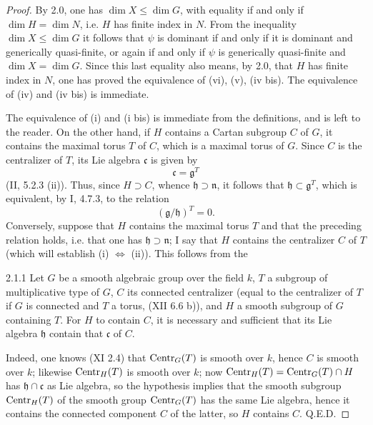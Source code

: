 \begin{proof}
By 2.0, one has $\dim X\leq\dim G$, with equality if and only if
$\dim H=\dim N$, i.e. $H$ has finite index in $N$. From the inequality
$\dim X\leq\dim G$ it follows that $\psi$ is dominant if and only if it
is dominant and generically quasi-finite, or again if and only if $\psi$
is generically quasi-finite and $\dim X=\dim G$. Since this last equality
also means, by 2.0, that $H$ has finite index in $N$, one has proved the
equivalence of (vi), (v), (iv bis). The equivalence of (iv) and (iv bis)
is immediate.

The equivalence of (i) and (i bis) is immediate from the definitions, and
is left to the reader. On the other hand, if $H$ contains a Cartan subgroup
$C$ of $G$, it contains the maximal torus $T$ of $C$, which is a maximal
torus of $G$. Since $C$ is the centralizer of $T$, its Lie algebra
$\mathfrak c$ is given by
\[
 \mathfrak c=\mathfrak g^T
\]
(II, 5.2.3 (ii)). Thus, since $H\supset C$, whence
$\mathfrak h\supset\mathfrak n$, it follows that
$\mathfrak h\subset\mathfrak g^T$, which is equivalent, by I, 4.7.3,
to the relation
\[
 (\mathfrak g/\mathfrak h)^T=0.\tag{x}
\]
Conversely, suppose that $H$ contains the maximal torus $T$ and that the
preceding relation holds, i.e. that one has $\mathfrak h\supset\mathfrak n$;
I say that $H$ contains the centralizer $C$ of $T$ (which will establish
(i) $\Leftrightarrow$ (ii)). This follows from the

\begin{lemma}{2.1.1}\label{XIII.2.1.1}
Let $G$ be a smooth algebraic group over the field $k$, $T$ a subgroup
of multiplicative type of $G$, $C$ its connected centralizer (equal to
the centralizer of $T$ if $G$ is connected and $T$ a torus, (XII 6.6 b)),
and $H$ a smooth subgroup of $G$ containing $T$. For $H$ to contain $C$,
it is necessary and sufficient that its Lie algebra $\mathfrak h$ contain
that $\mathfrak c$ of $C$.
\end{lemma}
Indeed, one knows (XI 2.4) that $\operatorname{Centr}_G(T)$ is smooth over $k$, hence
$C$ is smooth over $k$; likewise $\operatorname{Centr}_H(T)$ is smooth over $k$; now
$\operatorname{Centr}_H(T)=\operatorname{Centr}_G(T)\cap H$ has $\mathfrak h\cap\mathfrak c$ as Lie
algebra, so the hypothesis implies that the smooth subgroup $\operatorname{Centr}_H(T)$
of the smooth group $\operatorname{Centr}_G(T)$ has the same Lie algebra, hence it
contains the connected component $C$ of the latter, so $H$ contains $C$.
\hfill Q.E.D.


\end{proof}
